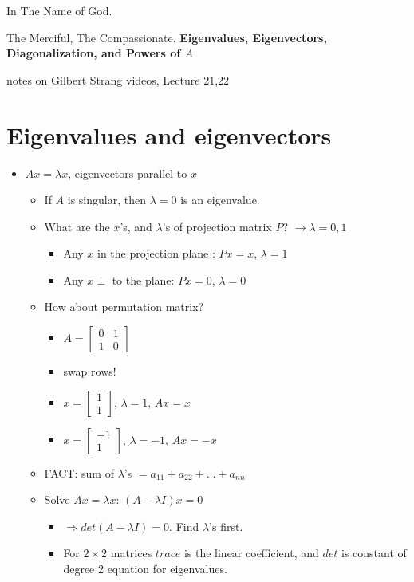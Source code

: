 \documentclass[a4paper,12pt]{article}
\theoremstyle{definition} \newtheorem{Theorem}{Theorem}
\begin{document}
\begin{center}
In The Name of God.

The Merciful, The Compassionate.
\vskip 1cm
{\Large\bfseries{Eigenvalues, Eigenvectors, Diagonalization, and Powers of $A$}}

\vskip 0.2cm
\tiny{notes on Gilbert Strang videos, Lecture 21,22}
\end{center}

\section{Eigenvalues and eigenvectors}
\begin{itemize}
	\item $Ax = \lambda x$, eigenvectors parallel to $x$
	\begin{itemize}
		\item  If $A$ is singular, then $\lambda = 0$ is an eigenvalue.
		\item What are the $x$'s, and $\lambda$'s of projection matrix $P$? $\longrightarrow \lambda = 0,1$
		\begin{itemize}
			\item Any $x$ in the projection plane : $Px = x$, $\lambda = 1$
			\item Any $x \perp$ to the plane: $Px = 0$, $\lambda = 0$ 
		\end{itemize}
		\item How about permutation matrix? 
		\begin{itemize}
			\item $A = \begin{bmatrix}0 & 1 \\ 1 & 0  \end{bmatrix}$
			\item swap rows!
			\item $x = \begin{bmatrix} 1 \\ 1 \end{bmatrix}$, $\lambda = 1$, $Ax=x$
			\item $x = \begin{bmatrix} -1 \\ 1 \end{bmatrix}$, $\lambda = -1$, $Ax=-x$
		\end{itemize}
		\item FACT: sum of $\lambda$'s $ = a_{11} + a_{22} + \ldots + a_{nn}$
		\item Solve $Ax = \lambda x$: $(A-\lambda I)x= 0$
		\begin{itemize}
			\item $\Rightarrow det(A-\lambda I) = 0$. Find $\lambda$'s first.
			\item For $2\times 2$ matrices $trace$ is the linear coefficient, and $det$ is constant of 
degree 2 equation for eigenvalues.


\end{itemize}
\end{itemize}
\end{itemize}
\end{document}
